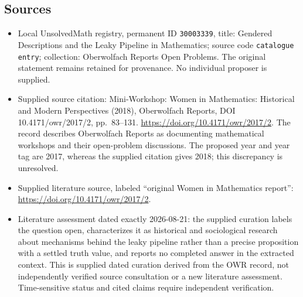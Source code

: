 \documentclass[11pt]{article}
\begin{document}
\subsection{Sources}
\begin{itemize}
\item Local UnsolvedMath registry, permanent ID \texttt{30003339}, title: Gendered Descriptions and the Leaky Pipeline in Mathematics; source code \texttt{catalogue entry}; collection: Oberwolfach Reports Open Problems. The original statement remains retained for provenance. No individual proposer is supplied.
\item Supplied source citation: Mini-Workshop: Women in Mathematics: Historical and Modern Perspectives (2018), Oberwolfach Reports, DOI 10.4171/owr/2017/2, pp.\ 83--131. \url{https://doi.org/10.4171/owr/2017/2}. The record describes Oberwolfach Reports as documenting mathematical workshops and their open-problem discussions. The proposed year and year tag are 2017, whereas the supplied citation gives 2018; this discrepancy is unresolved.
\item Supplied literature source, labeled ``original Women in Mathematics report'': \url{https://doi.org/10.4171/owr/2017/2}.
\item Literature assessment dated exactly 2026-08-21: the supplied curation labels the question open, characterizes it as historical and sociological research about mechanisms behind the leaky pipeline rather than a precise proposition with a settled truth value, and reports no completed answer in the extracted context. This is supplied dated curation derived from the OWR record, not independently verified source consultation or a new literature assessment. Time-sensitive status and cited claims require independent verification.
\end{itemize}
\end{document}
